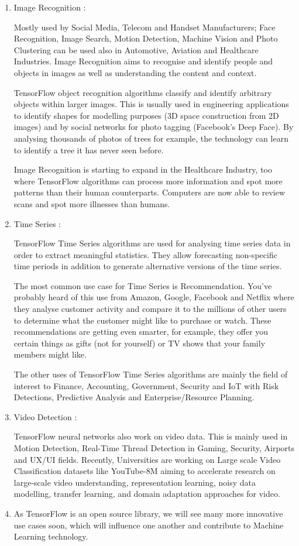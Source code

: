 \documentclass[14pt,a4paper]{article}
\begin{document}
\begin{enumerate}
\item Image Recognition :
\par Mostly used by Social Media, Telecom and Handset Manufacturers; Face Recognition, Image Search, Motion Detection, Machine Vision and Photo Clustering can be used also in Automotive, Aviation and Healthcare Industries. Image Recognition aims to recognise and identify people and objects in images as well as understanding the content and context.
\par TensorFlow object recognition algorithms classify and identify arbitrary objects within larger images. This is usually used in engineering applications to identify shapes for modelling purposes (3D space construction from 2D images) and by social networks for photo tagging (Facebook’s Deep Face). By analysing thousands of photos of trees for example, the technology can learn to identify a tree it has never seen before.
\par Image Recognition is starting to expand in the Healthcare Industry, too where TensorFlow algorithms can process more information and spot more patterns than their human counterparts. Computers are now able to review scans and spot more illnesses than humans.

\item Time Series :
\par TensorFlow Time Series algorithms are used for analysing time series data in order to extract meaningful statistics. They allow forecasting non-specific time periods in addition to generate alternative versions of the time series.
\par The most common use case for Time Series is Recommendation. You’ve probably heard of this use from Amazon, Google, Facebook and Netflix where they analyse customer activity and compare it to the millions of other users to determine what the customer might like to purchase or watch.  These recommendations are getting even smarter, for example, they offer you certain things as gifts (not for yourself) or TV shows that your family members might like.
\par The other uses of TensorFlow Time Series algorithms are mainly the field of interest to Finance, Accounting, Government, Security and IoT with Risk Detections, Predictive Analysis and Enterprise/Resource Planning.

\item Video Detection :
\par TensorFlow neural networks also work on video data. This is mainly used in Motion Detection, Real-Time Thread Detection in Gaming, Security, Airports and UX/UI fields.  Recently, Universities are working on Large scale Video Classification datasets like YouTube-8M aiming to accelerate research on large-scale video understanding, representation learning, noisy data modelling, transfer learning, and domain adaptation approaches for video.

\item As TensorFlow is an open source library, we will see many more innovative use cases soon, which will influence one another and contribute to Machine Learning technology.
\end{enumerate}
\end{document}
